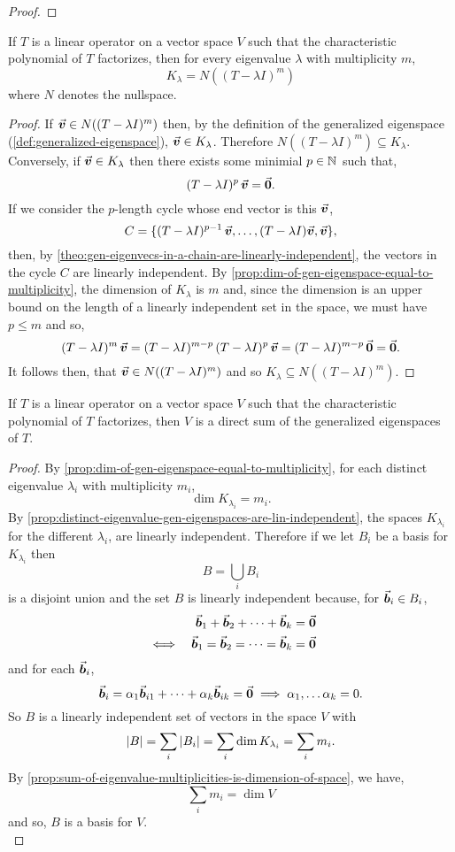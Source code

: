 \documentclass[../MathsNotesBase.tex]{subfiles}
\begin{document}
{\begin{proof}
		\end{proof}
		\begin{corollary}
			If $T$ is a linear operator on a vector space $V$ such that the characteristic polynomial of $T$ factorizes, then for every eigenvalue $\lambda$ with multiplicity $m$,
			\[ K_\lambda = N((T - \lambda I)^m) \]
			where $N$ denotes the nullspace.
		\end{corollary}
		\begin{proof}
			If ${ \vec{\bm{v}} \in N((T - \lambda I)^m) }$ then, by the definition of the generalized eigenspace (\ref{def:generalized-eigenspace}), ${ \vec{\bm{v}} \in K_\lambda }$. Therefore ${ N((T - \lambda I)^m) \subseteq K_\lambda }$.\\
			
			Conversely, if ${ \vec{\bm{v}} \in K_\lambda }$ then there exists some minimial ${ p \in \mathbb{N}^{} }$ such that,
			\[ (T - \lambda I)^p\,\vec{\bm{v}} = \vec{\bm{0}}. \]
			If we consider the $p$-length cycle whose end vector is this $\vec{\bm{v}}$,
			\[ C = \{ (T - \lambda I)^{p-1}\,\vec{\bm{v}}, \dots, (T - \lambda I)\vec{\bm{v}}, \vec{\bm{v}} \}, \]
			then, by \autoref{theo:gen-eigenvecs-in-a-chain-are-linearly-independent}, the vectors in the cycle $C$ are linearly independent. By \autoref{prop:dim-of-gen-eigenspace-equal-to-multiplicity}, the dimension of $K_\lambda$ is $m$ and, since the dimension is an upper bound on the length of a linearly independent set in the space, we must have ${ p \leq m }$ and so,
			\[ (T - \lambda I)^m\,\vec{\bm{v}} = (T - \lambda I)^{m-p}\,(T - \lambda I)^p\,\vec{\bm{v}} = (T - \lambda I)^{m-p}\,\vec{\bm{0}} = \vec{\bm{0}}. \]
			It follows then, that ${ \vec{\bm{v}} \in N((T - \lambda I)^m) }$ and so ${ K_\lambda \subseteq N((T - \lambda I)^m) }$.
		\end{proof}
		\begin{corollary}
			If $T$ is a linear operator on a vector space $V$ such that the characteristic polynomial of $T$ factorizes, then $V$ is a direct sum of the generalized eigenspaces of $T$.
		\end{corollary}
		\begin{proof}
			By \autoref{prop:dim-of-gen-eigenspace-equal-to-multiplicity}, for each distinct eigenvalue $\lambda_i$ with multiplicity $m_i$,
			\[ \dim K_{\lambda_i} = m_i. \]
			By \autoref{prop:distinct-eigenvalue-gen-eigenspaces-are-lin-independent}, the spaces $K_{\lambda_i}$ for the different $\lambda_i$, are linearly independent. Therefore if we let $B_i$ be a basis for $K_{\lambda_i}$ then
			\[ B = \bigcup_i B_i \]
			is a disjoint union and the set $B$ is linearly independent because, for ${ \vec{\bm{b}}_i \in B_i }$,
			\[\begin{aligned}
				&& \vec{\bm{b}}_1 + \vec{\bm{b}}_2 + \cdots + \vec{\bm{b}}_k &= \vec{\bm{0}} \\
				&\iff & \vec{\bm{b}}_1 = \vec{\bm{b}}_2 = \cdots = \vec{\bm{b}}_k &= \vec{\bm{0}}
			\end{aligned}\]
			and for each $\vec{\bm{b}}_i$,
			\[ \vec{\bm{b}}_i = \alpha_1 \vec{\bm{b}}_{i1} + \cdots + \alpha_k \vec{\bm{b}}_{ik} = \vec{\bm{0}} \implies \alpha_1,\dots\alpha_k = 0. \]
			So $B$ is a linearly independent set of vectors in the space $V$ with
			\[ \left\lvert B\right\rvert = \sum_i \left\lvert B_i\right\rvert = \sum_i \dim K_{\lambda_i} = \sum_i m_i. \]
			By \autoref{prop:sum-of-eigenvalue-multiplicities-is-dimension-of-space}, we have,
			\[ \sum_i m_i = \dim V \]
			and so, $B$ is a basis for $V$.\\
			

\end{proof}}
\end{document}
